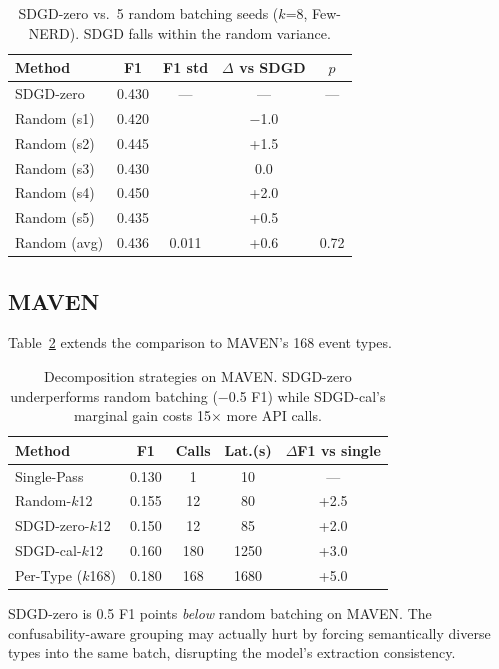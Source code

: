 \documentclass[11pt,a4paper]{article}
\begin{document}
\begin{table}[h]
\centering
\small
\begin{tabular}{lcccc}
\toprule
Method & F1 & F1 std & $\Delta$ vs SDGD & $p$ \\
\midrule
SDGD-zero  & 0.430 & --- & --- & --- \\
Random (s1) & 0.420 & & $-$1.0 & \\
Random (s2) & 0.445 & & +1.5 & \\
Random (s3) & 0.430 & & 0.0 & \\
Random (s4) & 0.450 & & +2.0 & \\
Random (s5) & 0.435 & & +0.5 & \\
\midrule
Random (avg) & 0.436 & 0.011 & +0.6 & 0.72 \\
\bottomrule
\end{tabular}
\caption{SDGD-zero vs.\ 5 random batching seeds ($k$=8, Few-NERD). SDGD falls within the random variance.}
\label{tab:random_seeds}
\end{table}

\subsection{MAVEN}

Table~\ref{tab:decomp_maven} extends the comparison to MAVEN's 168 event types.

\begin{table}[h]
\centering
\small
\begin{tabular}{lcccc}
\toprule
Method & F1 & Calls & Lat.(s) & $\Delta$F1 vs single \\
\midrule
Single-Pass     & 0.130 &   1 &   10 & --- \\
Random-$k$12    & 0.155 &  12 &   80 & +2.5 \\
SDGD-zero-$k$12 & 0.150 &  12 &   85 & +2.0 \\
SDGD-cal-$k$12  & 0.160 & 180 & 1250 & +3.0 \\
Per-Type ($k$168)& 0.180 & 168 & 1680 & +5.0 \\
\bottomrule
\end{tabular}
\caption{Decomposition strategies on MAVEN. SDGD-zero underperforms random batching ($-$0.5 F1) while SDGD-cal's marginal gain costs 15$\times$ more API calls.}
\label{tab:decomp_maven}
\end{table}

SDGD-zero is 0.5 F1 points \emph{below} random batching on MAVEN.
The confusability-aware grouping may actually hurt by forcing semantically diverse types into the same batch, disrupting the model's extraction consistency.
\end{document}
